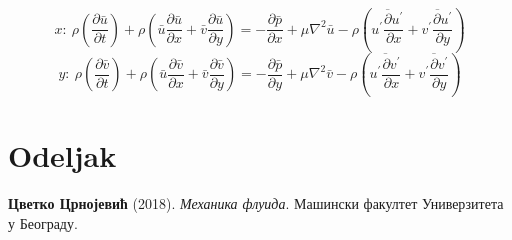 \documentclass[12pt,serbian]{article} %
\numberwithin{figure}{section}
\numberwithin{table}{section}
\begin{document}
\begin{equation}
    x:\ \displaystyle \rho \left(\frac{\partial \bar{u} }{\partial t}\right) + \rho \left(\bar{u}\frac{\partial \bar{u} }{\partial x}+ \bar{v}\frac{\partial \bar{u} }{\partial y}\right) = - \frac{\partial \bar{p} }{\partial x} + \mu \nabla^{2}\bar{u} - \rho \left(\overline{u^{\prime}\frac{\partial u^{\prime}}{\partial x}} +\overline{v^{\prime}\frac{\partial u^{\prime}}{\partial y}}\right)
\end{equation}
\begin{equation}
    y:\ \displaystyle \rho \left(\frac{\partial \bar{v} }{\partial t}\right) + \rho \left(\bar{u}\frac{\partial \bar{v} }{\partial x}+ \bar{v}\frac{\partial \bar{v} }{\partial y}\right) = - \frac{\partial \bar{p} }{\partial y} + \mu \nabla^{2}\bar{v} - \rho \left(\overline{u^{\prime}\frac{\partial v^{\prime}}{\partial x}} +\overline{v^{\prime}\frac{\partial v^{\prime}}{\partial y}}\right)
\end{equation}

\clearpage
\section{Odeljak}


\newpage
\renewcommand{\thepage}{} %

\begin{thebibliography}{1}


\textbf{Цветко Црнојевић} (2018).
\textit{Механика флуида}.
Машински факултет Универзитета у Београду.

\end{thebibliography}
\end{document}
